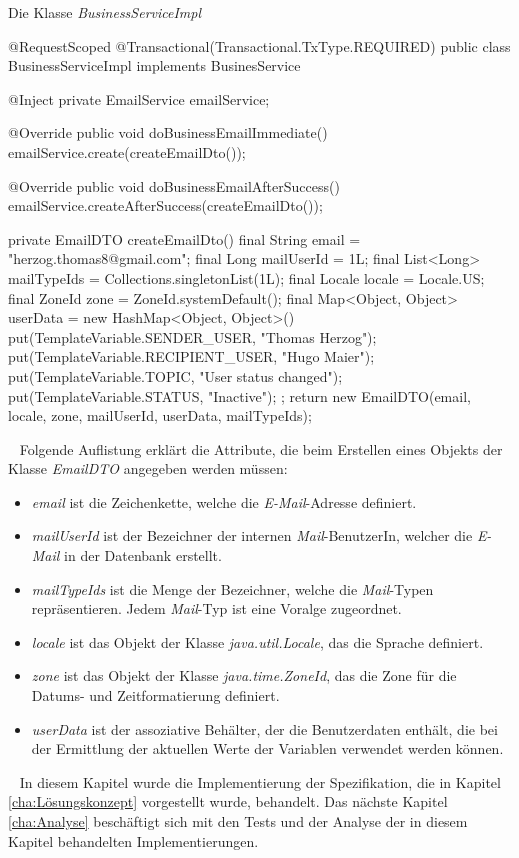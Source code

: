 \begin{program}[h]
\caption{Die Klasse \emph{BusinessServiceImpl}}
\label{prog:businessServiceImpl}
\begin{JavaCode}
@RequestScoped
@Transactional(Transactional.TxType.REQUIRED)
public class BusinessServiceImpl implements BusinesService {

    @Inject
    private EmailService emailService;
    
    @Override
    public void doBusinessEmailImmediate() {
        emailService.create(createEmailDto());
    }

    @Override
    public void doBusinessEmailAfterSuccess() {
        emailService.createAfterSuccess(createEmailDto());
    }

    private EmailDTO createEmailDto() {
        final String email = "herzog.thomas8@gmail.com";
        final Long mailUserId = 1L;
        final List<Long> mailTypeIds = Collections.singletonList(1L);
        final Locale locale = Locale.US;
        final ZoneId zone = ZoneId.systemDefault();
        final Map<Object, Object> userData = 
        	new HashMap<Object, Object>() {{
                put(TemplateVariable.SENDER_USER, "Thomas Herzog");
                put(TemplateVariable.RECIPIENT_USER, "Hugo Maier");
                put(TemplateVariable.TOPIC, "User status changed");
                put(TemplateVariable.STATUS, "Inactive");
            }};            
        return new EmailDTO(email, 
        					locale, 
        					zone, 
        					mailUserId, 
        					userData, 
        					mailTypeIds);
    }
    
}
\end{JavaCode}
\end{program}
\ \newline
Folgende Auflistung erklärt die Attribute, die beim Erstellen eines Objekts der Klasse \emph{EmailDTO} angegeben werden müssen:
\begin{itemize}
	\item\emph{email} ist die Zeichenkette, welche die \emph{E-Mail}-Adresse definiert.
	\item\emph{mailUserId} ist der Bezeichner der internen \emph{Mail}-BenutzerIn, welcher die \emph{E-Mail} in der Datenbank erstellt.
	\item\emph{mailTypeIds} ist die Menge der Bezeichner, welche die \emph{Mail}-Typen repräsentieren. Jedem \emph{Mail}-Typ ist eine Voralge zugeordnet.
	\item\emph{locale} ist das Objekt der Klasse \emph{java.util.Locale}, das die Sprache definiert.
	\item\emph{zone} ist das Objekt der Klasse \emph{java.time.ZoneId}, das die Zone für die Datums- und Zeitformatierung definiert.
	\item\emph{userData} ist der assoziative Behälter, der die Benutzerdaten enthält, die bei der Ermittlung der aktuellen Werte der Variablen verwendet werden können.
\end{itemize}
\ \newline
In diesem Kapitel wurde die Implementierung der Spezifikation, die in Kapitel \ref{cha:Lösungskonzept} vorgestellt wurde, behandelt. Das nächste Kapitel \ref{cha:Analyse} beschäftigt sich mit den Tests und der Analyse der in diesem Kapitel behandelten Implementierungen.
